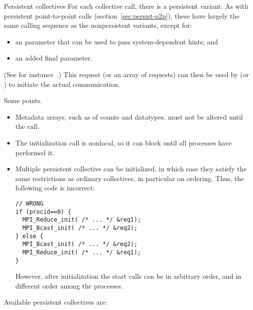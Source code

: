 \begin{mpifournote}{Persistent collectives}
For each collective call, there is a persistent variant.
As with persistent point-to-point calls (section~\ref{sec:persist-p2p}),
these have largely the same calling sequence as the nonpersistent variants,
except for:
\begin{itemize}
\item an  parameter that can be used to pass
  system-dependent hints; and
\item
  an added final  parameter.
\end{itemize}
(See for instance~.)
This request (or an array of requests) can then be used by
 (or )
to initiate the actual communication.


Some points.
\begin{itemize}
\item
  Metadata arrays, such as of counts and datatypes,
  must not be altered until the  call.
\item The initialization call is nonlocal, so it can block until all
  processes have performed it.
\item Multiple persistent collective can be initialized, in which case
  they satisfy the same restrictions as ordinary collectives, in particular
  on ordering. Thus, the following code is incorrect:
\begin{lstlisting}
// WRONG
if (procid==0) {
  MPI_Reduce_init( /* ... */ &req1);
  MPI_Bcast_init( /* ... */ &req2);
} else {
  MPI_Bcast_init( /* ... */ &req2);
  MPI_Reduce_init( /* ... */ &req1);
}
\end{lstlisting}
However, after initialization the start calls can be in arbitrary order,
and in different order among the processes.
\end{itemize}

\begin{raggedlist} %
  Available persistent collectives are:
\end{raggedlist} %

\end{mpifournote}

